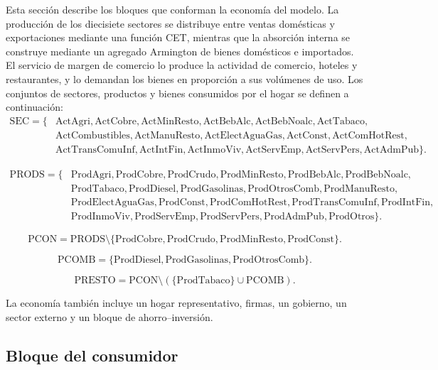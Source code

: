 \documentclass[11pt]{article}
\begin{document}
Esta sección describe los bloques que conforman la economía del modelo. La producción de los diecisiete sectores se distribuye entre ventas domésticas y exportaciones mediante una función CET, mientras que la absorción interna se construye mediante un agregado Armington de bienes domésticos e importados. El servicio de margen de comercio lo produce la actividad de comercio, hoteles y restaurantes, y lo demandan los bienes en proporción a sus volúmenes de uso. Los conjuntos de sectores, productos y bienes consumidos por el hogar se definen a continuación:
\[
\begin{aligned}
\mathrm{SEC}=\{&\mathrm{ActAgri},\mathrm{ActCobre},\mathrm{ActMinResto},\mathrm{ActBebAlc},\mathrm{ActBebNoalc},\mathrm{ActTabaco}, \\
&\mathrm{ActCombustibles},\mathrm{ActManuResto},\mathrm{ActElectAguaGas},\mathrm{ActConst},\mathrm{ActComHotRest}, \\
&\mathrm{ActTransComuInf},\mathrm{ActIntFin},\mathrm{ActInmoViv},\mathrm{ActServEmp},\mathrm{ActServPers},\mathrm{ActAdmPub}\}.
\end{aligned}
\]

\[
\begin{aligned}
\mathrm{PRODS}=\{&\mathrm{ProdAgri},\mathrm{ProdCobre},\mathrm{ProdCrudo},\mathrm{ProdMinResto},\mathrm{ProdBebAlc},\mathrm{ProdBebNoalc}, \\
&\mathrm{ProdTabaco},\mathrm{ProdDiesel},\mathrm{ProdGasolinas},\mathrm{ProdOtrosComb},\mathrm{ProdManuResto}, \\
&\mathrm{ProdElectAguaGas},\mathrm{ProdConst},\mathrm{ProdComHotRest},\mathrm{ProdTransComuInf},\mathrm{ProdIntFin}, \\
&\mathrm{ProdInmoViv},\mathrm{ProdServEmp},\mathrm{ProdServPers},\mathrm{ProdAdmPub},\mathrm{ProdOtros}\}.
\end{aligned}
\]

\[
\mathrm{PCON}=\mathrm{PRODS}\setminus\{\mathrm{ProdCobre},\mathrm{ProdCrudo},\mathrm{ProdMinResto},\mathrm{ProdConst}\}.
\]

\[
\mathrm{PCOMB}=\{\mathrm{ProdDiesel},\mathrm{ProdGasolinas},\mathrm{ProdOtrosComb}\}.
\]

\[
\mathrm{PRESTO}=\mathrm{PCON}\setminus\left(\{\mathrm{ProdTabaco}\}\cup\mathrm{PCOMB}\right).
\]

La economía también incluye un hogar representativo, firmas, un gobierno, un sector externo y un bloque de ahorro--inversión.

\subsection{Bloque del consumidor}
\label{sec:consumidor}
\end{document}
